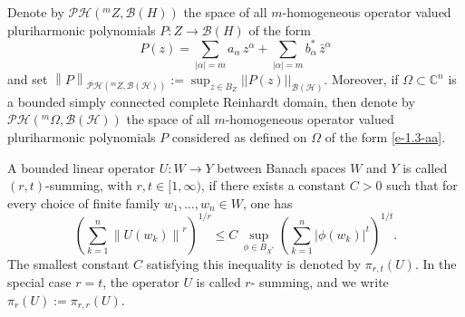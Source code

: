 \documentclass[a4paper,11pt, reqno]{amsart}
\theoremstyle{definition}
\newcommand{\norm}[1]{\left\lVert#1\right\rVert}
\begin{document}
Denote by $\mathcal{PH}(^m Z,\mathcal{B}(H))$ the space of all $m$-homogeneous operator valued pluriharmonic polynomials $P:Z \rightarrow \mathcal{B}(H)$ of the form 
\begin{equation} \label{e-1.3-aa}
	P(z)= \sum_{|\alpha|=m} a_{\alpha}\, z^{\alpha} +  \sum_{|\alpha|=m} b^{*}_{\alpha}\, \bar{z}^{\alpha}
\end{equation} 
and set $\norm{P}_{\mathcal{PH}(^m Z,\mathcal{B}(\mathcal{H}))}:=\sup_{z \in B_{Z}}||P(z)||_{\mathcal{B}(\mathcal{H})}$. Moreover, if $\Omega \subset \mathbb{C}^n$ is a bounded simply connected complete Reinhardt domain, then denote by $\mathcal{PH}(^m \Omega,\mathcal{B}(\mathcal{H}))$ the space of all $m$-homogeneous operator valued pluriharmonic polynomials $P$ considered as defined on $\Omega$ of the form \eqref{e-1.3-aa}. 
\par A bounded linear operator $U:W\rightarrow Y$ between Banach spaces $W$ and $Y$ is called $(r,t)$-summing, with $r,t \in [1,\infty)$, if there exists a constant $C>0$ such that for every choice of finite family $w_{1}, \ldots,w_{n} \in W$, one has
$$\left(\sum_{k=1}^{n} \norm{U(w_{k})}^r\right)^{1/r} \leq C \, \sup_{\phi \in B_{X^{*}}} \left(\sum_{k=1}^{n} |\phi(w_{k})|^t\right)^{1/t}.
$$
The smallest constant $C$ satisfying this inequality is denoted by $\pi_{r,t}(U)$. In the special case $r=t$, the operator $U$ is called $r$- summing, and we write $\pi_{r}(U):=\pi_{r,r}(U)$.
\end{document}
